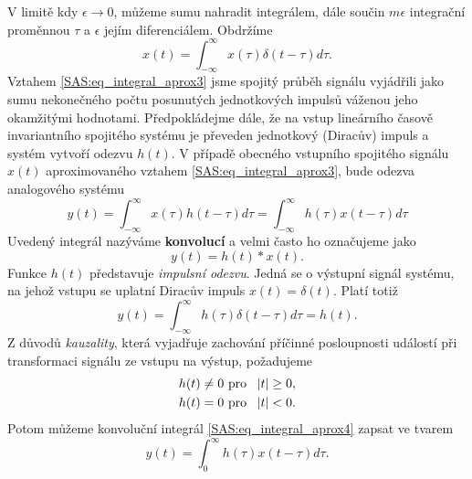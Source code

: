       V limitě kdy $\epsilon\rightarrow0$, můžeme sumu nahradit integrálem, dále součin $m\epsilon$ 
      integrační proměnnou $\tau$ a $\epsilon$ jejím diferenciálem. Obdržíme
      \begin{equation}\label{SAS:eq_integral_aprox3}
        x(t) = \int_{-\infty}^{\infty}x(\tau)\delta(t-\tau)d\tau .
      \end{equation}
      Vztahem \ref{SAS:eq_integral_aprox3} jsme spojitý průběh signálu vyjádřili jako sumu 
      nekonečného počtu posunutých jednotkových impulsů váženou jeho okamžitými hodnotami. 
      Předpokládejme dále, že na vstup lineárního časově invariantního spojitého systému je 
      převeden jednotkový (Diracův) impuls a systém vytvoří odezvu $h(t)$. V případě obecného 
      vstupního spojitého signálu $x(t)$ aproximovaného vztahem \ref{SAS:eq_integral_aprox3}, bude 
      odezva analogového systému
      \begin{equation}\label{SAS:eq_integral_aprox4}
        y(t) = \int_{-\infty}^{\infty}x(\tau)h(t-\tau)d\tau 
             = \int_{-\infty}^{\infty}h(\tau)x(t-\tau)d\tau
      \end{equation}
      Uvedený integrál nazýváme \textbf{konvolucí} a velmi často ho označujeme jako 
      \begin{equation}\label{SAS:eq_konvoluce}
        y(t) = h(t)*x(t) .
      \end{equation}
      Funkce $h(t)$ představuje \emph{impulsní odezvu}. Jedná se o výstupní signál systému, na 
      jehož vstupu se uplatní Diracův impuls $x(t)=\delta(t)$. Platí totiž
      \begin{equation}\label{SAS:eq_h_plati}
        y(t) = \int_{-\infty}^{\infty}h(\tau)\delta(t-\tau)d\tau = h(t) . 
      \end{equation}     
      Z důvodů \emph{kauzality}, která vyjadřuje zachování příčinné posloupnosti událostí při 
      transformaci signálu ze vstupu na výstup, požadujeme
      \begin{align}\label{SAS:eq_kauzalita_pozadavky}
        h(t) &\neq  0 \text{   pro } \abs{t} \geq0, \\
        h(t) &  =   0 \text{   pro } \abs{t} < 0. 
      \end{align}    
      Potom můžeme konvoluční integrál \ref{SAS:eq_integral_aprox4} zapsat ve tvarem
      \begin{equation}\label{SAS:eq_konvolucni_integral}
         y(t) = \int_0^{\infty}h(\tau)x(t-\tau)d\tau .
      \end{equation} 
  
